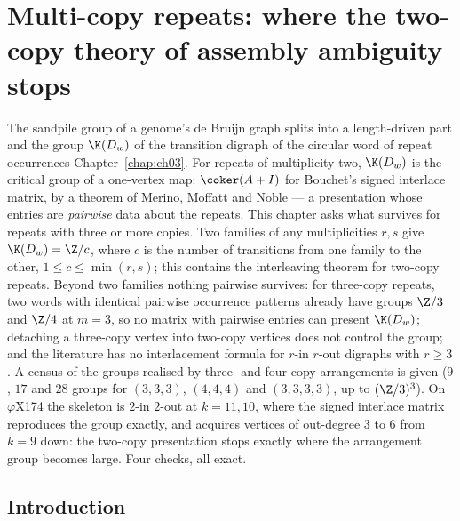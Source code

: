 \chapter[Multi-copy repeats]{Multi-copy repeats: where the two-copy theory of assembly ambiguity stops}\label{chap:ch04}
\begin{chaptersummary}
The sandpile group of a genome's de Bruijn graph splits into a length-driven part and
the group $\K(D_w)$ of the transition digraph of the circular word of repeat occurrences
Chapter~\ref{chap:ch03}. For repeats of multiplicity two, $\K(D_w)$ is the critical group of a
one-vertex map: $\coker(A+I)$ for Bouchet's signed interlace matrix, by a theorem of
Merino, Moffatt and Noble --- a presentation whose entries are \emph{pairwise} data
about the repeats. This chapter asks what survives for repeats with three or more copies.
Two families of any multiplicities $r,s$ give $\K(D_w)=\Z/c$, where $c$ is the number of
transitions from one family to the other, $1\le c\le\min(r,s)$; this contains the
interleaving theorem for two-copy repeats. Beyond two families nothing pairwise survives:
for three-copy repeats, two words with identical pairwise occurrence patterns already
have groups $\Z/3$ and $\Z/4$ at $m=3$, so no matrix with pairwise entries can present
$\K(D_w)$; detaching a three-copy vertex into two-copy vertices does not control the
group; and the literature has no interlacement formula for $r$-in $r$-out digraphs with
$r\ge3$. A census of the groups realised by three- and four-copy arrangements is given
($9$, $17$ and $28$ groups for $(3,3,3)$, $(4,4,4)$ and $(3,3,3,3)$, up to $(\Z/3)^{3}$).
On $\varphi$X174 the skeleton is $2$-in $2$-out at $k=11,10$, where the signed interlace
matrix reproduces the group exactly, and acquires vertices of out-degree $3$ to $6$ from
$k=9$ down: the two-copy presentation stops exactly where the arrangement group becomes
large. Four checks, all exact.
\end{chaptersummary}

\section{Introduction}\label{ch04:sec:intro}

